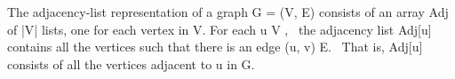 \documentclass[preview]{standalone}
\begin{document}
\begin{center}
The adjacency-list representation of a graph G = (V, E) consists of an array Adj of |V| lists,
 one for each vertex in V. For each u \in V , \ the adjacency list Adj[u] contains all the vertices such that there is an edge (u, v) \in E. \ That is, Adj[u] consists of all the vertices adjacent to u in G.
\end{center}
\end{document}
